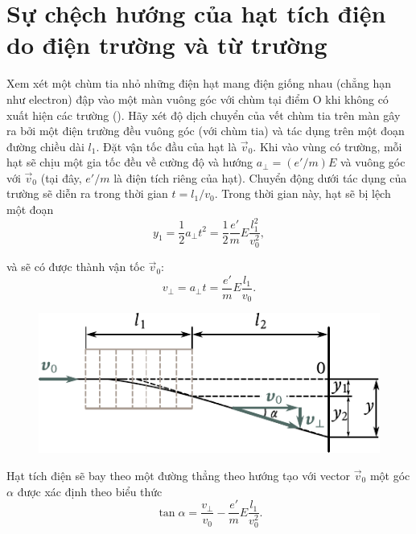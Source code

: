 \section{Sự chệch hướng của hạt tích điện 
do điện trường và từ trường}\label{sec:10_2}

Xem xét một chùm tia nhỏ những điện hạt mang điện giống nhau (chẳng hạn như electron) đập vào một màn vuông góc với chùm tại điểm O khi không có xuất hiện các trường ().
Hãy xét độ dịch chuyển của vết chùm tia trên màn gây ra bởi một điện trường đều vuông góc (với chùm tia) và tác dụng trên một đoạn đường chiều dài $l_1$.
Đặt vận tốc đầu của hạt là $\vec{v}_0$.
Khi vào vùng có trường, mỗi hạt sẽ chịu một gia tốc đều về cường độ và hướng $a_{\perp}=(e'/m)E$ và vuông góc với $\vec{v}_0$ (tại đây, $e'/m$ là điện tích riêng của hạt).
Chuyển động dưới tác dụng của trường sẽ diễn ra trong thời gian $t = l_1/v_0$.
Trong thời gian này, hạt sẽ bị lệch một đoạn
\begin{equation}\label{eq:10_5}
    y_1 = \frac{1}{2} a_{\perp} t^2 = \frac{1}{2} \frac{e'}{m} E \frac{l_1^2}{v_0^2},
\end{equation}

\noindent
và sẽ có được thành vận tốc $\vec{v}_0$:
\begin{equation*}
    v_{\perp} = a_{\perp} t = \frac{e'}{m} E \frac{l_1}{v_0}.
\end{equation*}

\begin{figure}[t]
	\begin{center}
		\includegraphics[scale=0.98]{figures/ch_10/fig_10_3.pdf}
		\caption[]{}
		\label{fig:10_3}
	\end{center}
	\vspace{-0.85cm}
\end{figure}

Hạt tích điện sẽ bay theo một đường thẳng theo hướng tạo với vector $\vec{v}_0$ một góc $\alpha$ được xác định theo biểu thức
\begin{equation}\label{eq:10_6}
    \tan\alpha = \frac{v_{\perp}}{v_0} - \frac{e'}{m} E \frac{l_1}{v_0^2}.
\end{equation}

